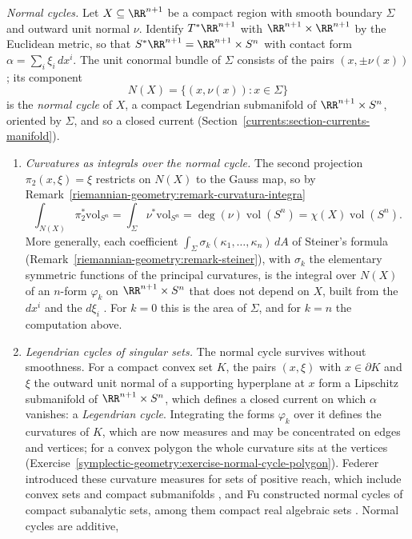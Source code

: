 \begin{remark}\label{symplectic-geometry:remark-normal-cycles}
\emph{Normal cycles.} Let $X \subseteq \RR^{n+1}$ be a compact region with smooth boundary $\Sigma$ and outward unit normal $\nu$. Identify $T^*\RR^{n+1}$ with $\RR^{n+1} \times \RR^{n+1}$ by the Euclidean metric, so
that $S^*\RR^{n+1} = \RR^{n+1} \times S^n$ with contact form $\alpha = \sum_i\xi_i\,dx^i$. The unit conormal bundle of $\Sigma$ consists of the pairs $(x, \pm\nu(x))$; its component
\[
N(X) = \{(x, \nu(x)) : x \in \Sigma\}
\]
is the \emph{normal cycle} of $X$, a compact Legendrian submanifold of $\RR^{n+1} \times S^n$, oriented by $\Sigma$, and so a closed current (Section~\ref{currents:section-currents-manifold}).
\begin{enumerate}
\item \emph{Curvatures as integrals over the normal cycle.} The second projection $\pi_2(x, \xi) = \xi$ restricts on $N(X)$ to the Gauss map, so by Remark~\ref{riemannian-geometry:remark-curvatura-integra}
\[
\int_{N(X)}\pi_2^*\mathrm{vol}_{S^n} = \int_\Sigma\nu^*\mathrm{vol}_{S^n} = \deg(\nu)\operatorname{vol}(S^n) = \chi(X)\operatorname{vol}(S^n) .
\]
More generally, each coefficient $\int_\Sigma\sigma_k(\kappa_1, \ldots, \kappa_n)\,dA$ of Steiner's formula (Remark~\ref{riemannian-geometry:remark-steiner}), with $\sigma_k$ the elementary symmetric functions of the principal
curvatures, is the integral over $N(X)$ of an $n$-form $\varphi_k$ on $\RR^{n+1} \times S^n$ that does not depend on $X$, built from the $dx^i$ and the $d\xi_i$ \cite{fu-1994}. For $k = 0$ this is the area of
$\Sigma$, and for $k = n$ the computation above.
\item \emph{Legendrian cycles of singular sets.} The normal cycle survives without smoothness. For a compact convex set $K$, the pairs $(x, \xi)$ with $x \in \partial K$ and $\xi$ the outward unit normal of a
supporting hyperplane at $x$ form a Lipschitz submanifold of $\RR^{n+1} \times S^n$, which defines a closed current on which $\alpha$ vanishes: a \emph{Legendrian cycle}. Integrating the forms $\varphi_k$ over it defines the
curvatures of $K$, which are now measures and may be concentrated on edges and vertices; for a convex polygon the whole curvature sits at the vertices
(Exercise~\ref{symplectic-geometry:exercise-normal-cycle-polygon}). Federer introduced these curvature measures for sets of positive reach, which include convex sets and compact submanifolds
\cite{federer-1959}, and Fu constructed normal cycles of compact subanalytic sets, among them compact real algebraic sets \cite{fu-1994}. Normal cycles are additive,

\end{enumerate}
\end{remark}
